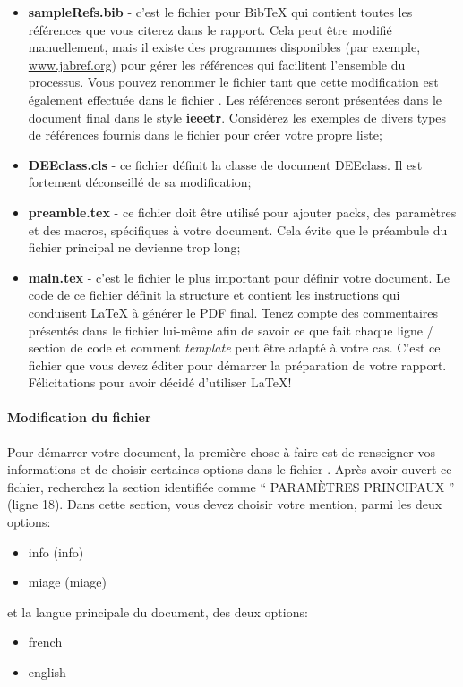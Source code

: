 \begin{itemize}
    \item \textbf{sampleRefs.bib} - c'est le fichier pour BibTeX qui contient toutes les références que vous citerez dans le rapport. Cela peut être modifié manuellement, mais il existe des programmes disponibles (par exemple, \url{www.jabref.org}) pour gérer les références qui facilitent l'ensemble du processus. Vous pouvez renommer le fichier tant que cette modification est également effectuée dans le fichier . Les références seront présentées dans le document final dans le style \textbf{ieeetr}. Considérez les exemples de divers types de références fournis dans le fichier  pour créer votre propre liste;

    \item \textbf{DEEclass.cls} - ce fichier définit la classe de document DEEclass. Il est fortement déconseillé de sa modification;

    \item \textbf{preamble.tex} - ce fichier doit être utilisé pour ajouter \glspl{pack}, des paramètres et des macros, spécifiques à votre document. Cela évite que le préambule du fichier principal  ne devienne trop long;

    \item \textbf{main.tex} - c'est le fichier le plus important pour définir votre document. Le code de ce fichier définit la structure et contient les instructions qui conduisent \LaTeX{} à générer le PDF final. Tenez compte des commentaires présentés dans le fichier lui-même afin de savoir ce que fait chaque ligne / section de code et comment \textit{template} peut être adapté à votre cas. C'est ce fichier que vous devez éditer pour démarrer la préparation de votre rapport. Félicitations pour avoir décidé d'utiliser \LaTeX{}!
\end{itemize}


\paragraph{Modification du fichier }
\label{subsec: Ch2.2.3}

Pour démarrer votre document, la première chose à faire est de renseigner vos informations et de choisir certaines options dans le fichier . Après avoir ouvert ce fichier, recherchez la section identifiée comme `` PARAMÈTRES PRINCIPAUX '' (ligne 18). Dans cette section, vous devez choisir votre mention, parmi les deux options:
\begin{itemize}
    \item \acs{info} (\acl{info})
    \item \acs{miage} (\acl{miage})
\end{itemize}
\newpage
\noindent et la langue principale du document, des deux options:
\begin{itemize}
    \item french
    \item english
\end{itemize}

